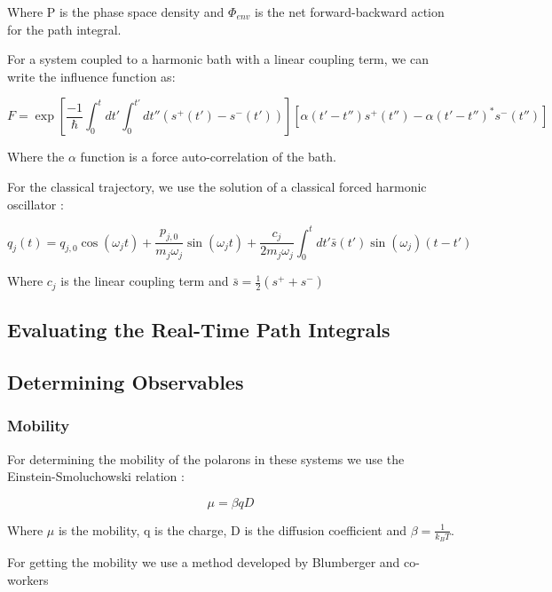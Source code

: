 Where P is the phase space density and $\Phi_{env}$ is the net forward-backward action for the path integral.

For a system coupled to a harmonic bath with a linear coupling term, we can write the influence function as: 

\begin{equation}
    F = \exp[\frac{-1}{\hbar} \int_0^{t} dt' \int_{0}^{t'} dt'' (s^+(t') - s^-(t'))][\alpha(t' - t'')s^+(t'') - \alpha(t' - t'')^{*}s^-(t'')]
\end{equation}

Where the $\alpha$ function is a force auto-correlation of the bath. 

For the classical trajectory, we use the solution of a classical forced harmonic oscillator :

\begin{equation}
    q_j(t) = q_{j,0}\cos(\omega_j t) + \frac{p_{j,0}}{m_j \omega_j} \sin(\omega_j t) + \frac{c_j}{2 m_j \omega_j} \int_0^{t} dt' \bar{s}(t')\sin(\omega_j)(t-t')
\end{equation}

Where $c_j$ is the linear coupling term and $\bar{s} = \frac{1}{2}(s^+ + s^-)$ 

\subsection{Evaluating the Real-Time Path Integrals}

\subsection{Determining Observables}

\subsubsection{Mobility}

For determining the mobility of the polarons in these systems we use the Einstein-Smoluchowski relation : 

\begin{equation}
    \mu = \beta qD
\end{equation}

Where $\mu$ is the mobility, q is the charge, D is the diffusion coefficient and $\beta = \frac{1}{k_B T}$. 

For getting the mobility we use a method developed by Blumberger and co-workers \cite{blumberger} 

